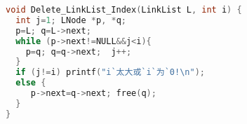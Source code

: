 \begin{lstlisting}[language=C]
void Delete_LinkList_Index(LinkList L, int i) {
  int j=1; LNode *p, *q;  
  p=L; q=L->next;
  while (p->next!=NULL&&j<i){
    p=q; q=q->next;  j++;
  }
  if (j!=i) printf("i`太大或`i`为`0!\n");
  else {
     p->next=q->next; free(q);
  }
}
\end{lstlisting}
